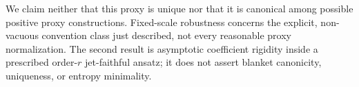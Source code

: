 We claim neither that this proxy is unique nor that it is canonical among
possible positive proxy constructions.  Fixed-scale robustness concerns the
explicit, non-vacuous convention class just described, not every reasonable
proxy normalization.  The second result is asymptotic coefficient rigidity
inside a prescribed order-\(r\) jet-faithful ansatz; it does not assert
blanket canonicity, uniqueness, or entropy minimality.
